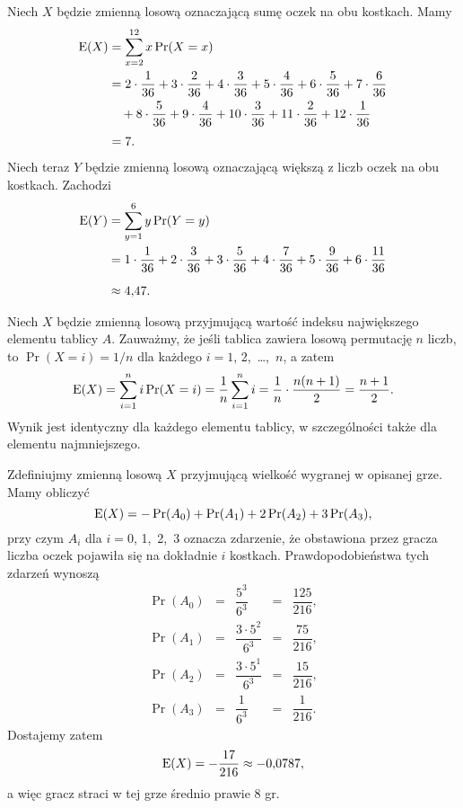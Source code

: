 
\exercise{} %
\noindent Niech $X$ będzie zmienną losową oznaczającą sumę oczek na obu kostkach. Mamy
\begin{align*}
	\operatorname{E}(X) &= \sum_{x=2}^{12}x\Pr(X=x) \\
	&= 2\cdot\frac{1}{36}+3\cdot\frac{2}{36}+4\cdot\frac{3}{36}+5\cdot\frac{4}{36}+6\cdot\frac{5}{36}+7\cdot\frac{6}{36} \\
	&\quad +8\cdot\frac{5}{36}+9\cdot\frac{4}{36}+10\cdot\frac{3}{36}+11\cdot\frac{2}{36}+12\cdot\frac{1}{36} \\[1mm]
	&= 7.
\end{align*}
Niech teraz $Y$ będzie zmienną losową oznaczającą większą z liczb oczek na obu kostkach. Zachodzi
\begin{align*}
	\operatorname{E}(Y) &= \sum_{y=1}^{6}y\Pr(Y=y) \\
	&= 1\cdot\frac{1}{36}+2\cdot\frac{3}{36}+3\cdot\frac{5}{36}+4\cdot\frac{7}{36}+5\cdot\frac{9}{36}+6\cdot\frac{11}{36} \\[2mm]
	&\approx 4{,}47.
\end{align*}

\exercise{} %
\noindent Niech $X$ będzie zmienną losową przyjmującą wartość indeksu największego elementu tablicy $A$. Zauważmy, że jeśli tablica zawiera losową permutację $n$ liczb, to $\Pr(X=i)=1/n$ dla każdego $i=1$, 2,~\dots,~$n$, a zatem
\[
	\operatorname{E}(X) = \sum_{i=1}^ni\Pr(X=i) = \frac{1}{n}\sum_{i=1}^ni = \frac{1}{n}\cdot\frac{n(n+1)}{2} = \frac{n+1}{2}.
\]
Wynik jest identyczny dla każdego elementu tablicy, w szczególności także dla elementu najmniejszego.

\exercise{} %
\noindent Zdefiniujmy zmienną losową $X$ przyjmującą wielkość wygranej w opisanej grze. Mamy obliczyć
\[
	\operatorname{E}(X) = -\Pr(A_0)+\Pr(A_1)+2\Pr(A_2)+3\Pr(A_3),
\]
przy czym $A_i$ dla $i=0$, 1,~2,~3 oznacza zdarzenie, że obstawiona przez gracza liczba oczek pojawiła się na dokładnie $i$ kostkach. Prawdopodobieństwa tych zdarzeń wynoszą
\[
	\begin{matrix}
	\Pr(A_0) &=& \dfrac{5^3}{6^3} &=& \dfrac{125}{216}, \\[3mm]
	\Pr(A_1) &=& \dfrac{3\cdot 5^2}{6^3} &=& \dfrac{75}{216}, \\[3mm]
	\Pr(A_2) &=& \dfrac{3\cdot 5^1}{6^3} &=& \dfrac{15}{216}, \\[3mm]
	\Pr(A_3) &=& \dfrac{1}{6^3} &=& \dfrac{1}{216}.
	\end{matrix}
\]
Dostajemy zatem
\[
	\operatorname{E}(X) = -\dfrac{17}{216} \approx -0{,}0787,
\]
a więc gracz straci w tej grze średnio prawie 8 gr.

